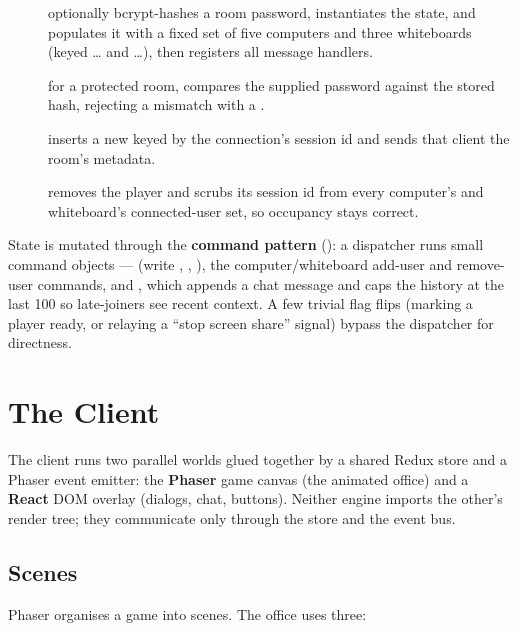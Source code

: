 \begin{description}
  \item[] optionally bcrypt-hashes a room password, instantiates
  the state, and populates it with a fixed set of five computers and three
  whiteboards (keyed \ldots{} and \ldots{}),
  then registers all message handlers.
  \item[] for a protected room, compares the supplied password
  against the stored hash, rejecting a mismatch with a .
  \item[] inserts a new  keyed by the connection's
  session id and sends that client the room's metadata.
  \item[] removes the player and scrubs its session id from every
  computer's and whiteboard's connected-user set, so occupancy stays correct.
\end{description}

State is mutated through the \textbf{command pattern} ():
a dispatcher runs small command objects ---  (write
, , ), the computer/whiteboard add-user and remove-user
commands, and , which appends a chat message and
caps the history at the last 100 so late-joiners see recent context. A few trivial
flag flips (marking a player ready, or relaying a ``stop screen share'' signal)
bypass the dispatcher for directness.

\section{The Client}

The client runs two parallel worlds glued together by a shared Redux store and a
Phaser event emitter: the \textbf{Phaser} game canvas (the animated office) and a
\textbf{React} DOM overlay (dialogs, chat, buttons). Neither engine imports the
other's render tree; they communicate only through the store and the event bus.

\subsection{Scenes}

Phaser organises a game into scenes. The office uses three:

